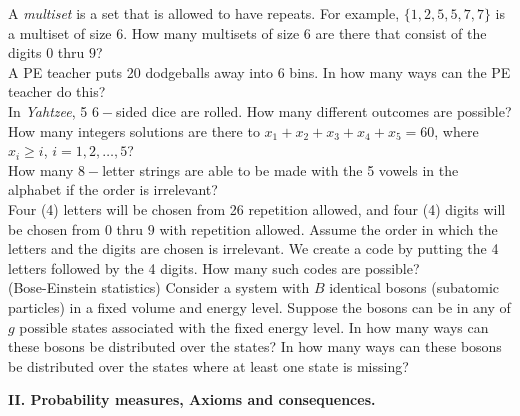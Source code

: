 \documentclass[12pt]{article}
\begin{document}
 A {\em multiset} is a set that is allowed to have repeats. For example, $\{1,2,5,5,7,7\}$ is a multiset of size 6. How many multisets of size 6 are there that consist of the digits $0$ thru $9$?\\

 A PE teacher puts 20 dodgeballs away into 6 bins. In how many ways can the PE teacher do this?\\


 In {\em Yahtzee}, 5 $6-$sided dice are rolled. How many different outcomes are possible?\\

 How many integers solutions are there to $x_1 + x_2 + x_3 + x_4 + x_5 = 60$, where $x_i \geq i$, $i = 1,2,\dots, 5$?\\



 How many $8-$letter strings are able to be made with the 5 vowels in the alphabet if the order is irrelevant?\\

 Four (4) letters will be chosen from 26 repetition allowed, and four (4) digits will be chosen from $0$ thru $9$ with repetition allowed.
Assume the order in which the letters and the digits are chosen is irrelevant.  We create a code by putting the 4 letters followed by the 4 digits.
How many such codes are possible?\\


 (Bose-Einstein statistics)
Consider a system with $B$ identical bosons (subatomic particles) in a fixed volume and energy level.
Suppose the bosons can be in any of $g$ possible states associated with the fixed energy level.
In how many ways can these bosons be distributed over the states?
In how many ways can these bosons be distributed over the states where at least one state is missing?


\newpage


\begin{center} {\bf \Large II. Probability measures, Axioms and consequences.}\end{center}
\end{document}

